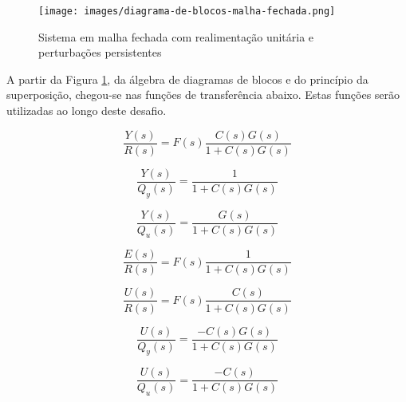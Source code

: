 \begin{figure}[htp]
	\centering
    \captionsetup{justification=centering}
	\caption{Sistema em malha fechada com realimentação unitária e perturbações
    persistentes}
	\label{fig:diagrama-de-blocos-malha-fechada}
	\texttt{[image: images/diagrama-de-blocos-malha-fechada.png]}
\end{figure}

A partir da Figura \ref{fig:diagrama-de-blocos-malha-fechada}, da álgebra de
diagramas de blocos e do princípio da superposição, chegou-se nas funções de
transferência abaixo. Estas funções serão utilizadas ao longo deste desafio.

\begin{equation}
    \label{eq:y2r-tf}
    \frac{Y(s)}{R(s)} = F(s)\frac{C(s)G(s)}{1 + C(s)G(s)}
\end{equation}

\begin{equation}
    \label{eq:y2qy-tf}
    \frac{Y(s)}{Q_{y}(s)} = \frac{1}{1 + C(s)G(s)}
\end{equation}

\begin{equation}
    \label{eq:y2qu-tf}
    \frac{Y(s)}{Q_{u}(s)} = \frac{G(s)}{1 + C(s)G(s)}
\end{equation}

\begin{equation}
    \label{eq:e2r-tf}
    \frac{E(s)}{R(s)} = F(s)\frac{1}{1 + C(s)G(s)}
\end{equation}

\begin{equation}
    \label{eq:u2r-tf}
    \frac{U(s)}{R(s)} = F(s)\frac{C(s)}{1 + C(s)G(s)}
\end{equation}

\begin{equation}
    \label{eq:u2qy-tf}
    \frac{U(s)}{Q_{y}(s)} = \frac{-C(s)G(s)}{1 + C(s)G(s)}
\end{equation}

\begin{equation}
    \label{eq:u2qu-tf}
    \frac{U(s)}{Q_{u}(s)} = \frac{-C(s)}{1 + C(s)G(s)}
\end{equation}

